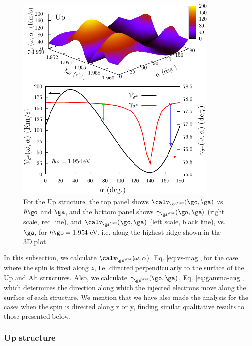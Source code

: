 \documentclass[floatfix,prb,aps,superscriptaddress,showpacs,11pt,preprint,letterpaper]{revtex4}
\def\tama{10cm}
\begin{document}
\begin{figure}[t]
\centering
\includegraphics[width=\tama]{upplots/up-vsz-w2}
\caption{For the Up structure, the top panel shows $\calv_{\gs^\rmz} (\go,\ga)$
vs. $\hbar\go$ and $\ga$, and the bottom panel shows $\gamma_{\gs^\rmz}
(\go,\ga)$ (right scale, red line), and $\calv_{\gs^\rmz} (\go,\ga)$ (left
scale, black line), vs. $\ga$, for $\hbar\go=1.954$\,eV, i.e. along the
highest ridge shown in the 3D plot. }
\label{fig:up-vsz-w2}
\end{figure}

In this subsection, we calculate $\calv_{\gs^\rmz}(\omega,\alpha)$, Eq.
\eqref{eq:vs-mag}, for the case where the spin is fixed along $z$, i.e.
directed perpendicularly to the surface of the Up and Alt structures. Also, we
calculate $\gamma_{\gs^\rmz}(\go,\ga)$, Eq. \eqref{eq:gamma-ang}, which
determines the direction along which the injected electrons move along the
surface of  each structure. We mention that we have also made the analysis for
the cases when the spin  is directed along $\mathrm{x}$ or $\mathrm{y}$,
finding similar qualitative results to those presented below.
% 

\subsubsection{Up structure}\label{up:fs}
\end{document}
